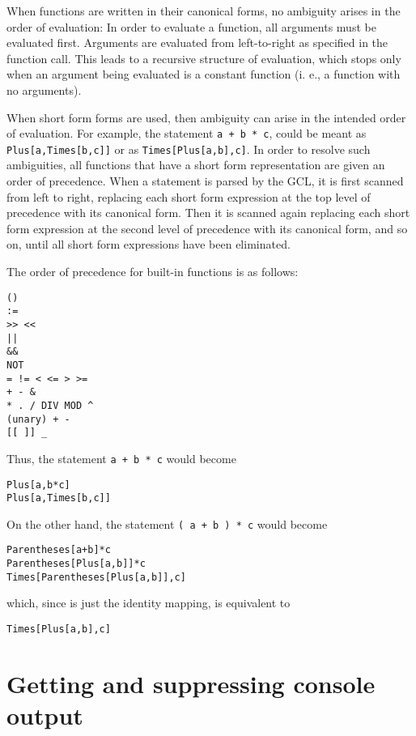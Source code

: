 When functions are written in their canonical forms, no ambiguity
arises in the order of evaluation: In order to evaluate a function,
all arguments must be evaluated first.  Arguments are evaluated from
left-to-right as specified in the function call.  This leads to a
recursive structure of evaluation, which stops only when an argument
being evaluated is a constant function (i. e., a function with no
arguments).

When short form forms are used, then ambiguity can arise in the
intended order of evaluation.  For example, the statement \verb&a + b * c&, 
could be meant as \verb+Plus[a,Times[b,c]]+ or as
\verb+Times[Plus[a,b],c]+.  In order to resolve such ambiguities, all
functions that have a short form representation are given an order of
precedence.  When a statement is parsed by the GCL, it is first
scanned from left to right, replacing each short form expression at
the top level of precedence with its canonical form.  Then it is
scanned again replacing each short form expression at the second level
of precedence with its canonical form, and so on, until all short form
expressions have been eliminated.

The order of precedence for built-in functions is as follows:

\begin{center}
\begin{verbatim}
()
:=
>> <<
||
&&
NOT
= != < <= > >=
+ - &
* . / DIV MOD ^
(unary) + -
[[ ]] _ 
\end{verbatim}
\end{center}

Thus, the statement \verb&a + b * c& would become 
\begin{verbatim}
Plus[a,b*c]
Plus[a,Times[b,c]]
\end{verbatim}

\noindent
On the other hand, the statement \verb&( a + b ) * c& would become 
\begin{verbatim}
Parentheses[a+b]*c
Parentheses[Plus[a,b]]*c
Times[Parentheses[Plus[a,b]],c]
\end{verbatim}

\noindent
which, since  is just the identity mapping, is
equivalent to
\begin{verbatim}
Times[Plus[a,b],c]
\end{verbatim}

\medskip

\section{Getting and suppressing console output}

